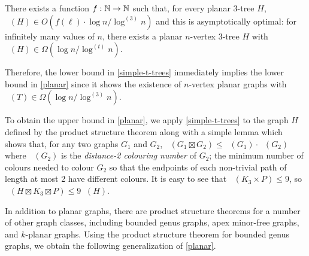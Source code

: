 \documentclass[kpfonts]{patmorin}
\DeclareMathOperator{\trn}{\chi_2}
\DeclareMathOperator{\lrn}{\chi_{\ell}}
\DeclareMathOperator{\dtcn}{\bar{\chi}_2}
\theoremstyle{named}
\begin{document}
\begin{thm}\label{simple-t-trees}
    There exists a function $f:\mathbb{N}\to\mathbb{N}$ such that, for every planar 3-tree $H$, $\lrn(H)\in O(f(\ell)\cdot\log n/\log^{(3)} n)$ and this is asymptotically optimal: for infinitely many values of $n$, there exists a planar $n$-vertex $3$-tree $H$ with $\trn(H)\in\Omega(\log n/\log^{(t)} n)$.
\end{thm}


Therefore, the lower bound in \cref{simple-t-trees} immediately implies the lower bound in \cref{planar} since it shows the existence of $n$-vertex planar graphs with $\trn(T)\in\Omega(\log n/\log^{(3)} n)$.

To obtain the upper bound in \cref{planar}, we apply \cref{simple-t-trees} to the graph $H$ defined by the product structure theorem along with a simple lemma which shows that, for any two graphs $G_1$ and $G_2$, $\trn(G_1\boxtimes G_2)\le \trn(G_1)\cdot\dtcn(G_2)$ where $\dtcn(G_2)$ is the \emph{distance-2 colouring number} of $G_2$;  the minimum number of colours needed to colour $G_2$ so that the endpoints of each non-trivial path of length at most 2 have different colours.  It is easy to see that $\dtcn(K_3\times P)\le 9$, so $\trn(H\boxtimes K_3\boxtimes P)\le 9\trn(H)$.

%
%
%

In addition to planar graphs, there are product structure theorems for a number of other graph classes, including bounded genus graphs, apex minor-free graphs, and $k$-planar graphs.  Using the product structure theorem for bounded genus graphs, we obtain the following generalization of \cref{planar}.
\end{document}
